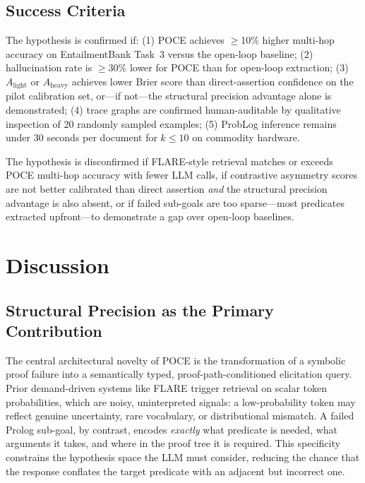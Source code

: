\documentclass[11pt,letterpaper]{article}
\begin{document}
\subsection{Success Criteria}

The hypothesis is confirmed if: (1) POCE achieves $\geq$10\% higher multi-hop accuracy on EntailmentBank Task~3 versus the open-loop baseline; (2) hallucination rate is $\geq$30\% lower for POCE than for open-loop extraction; (3) $A_\text{light}$ or $A_\text{heavy}$ achieves lower Brier score than direct-assertion confidence on the pilot calibration set, or---if not---the structural precision advantage alone is demonstrated; (4) trace graphs are confirmed human-auditable by qualitative inspection of 20 randomly sampled examples; (5) ProbLog inference remains under 30 seconds per document for $k \leq 10$ on commodity hardware.

The hypothesis is disconfirmed if FLARE-style retrieval matches or exceeds POCE multi-hop accuracy with fewer LLM calls, if contrastive asymmetry scores are not better calibrated than direct assertion \emph{and} the structural precision advantage is also absent, or if failed sub-goals are too sparse---most predicates extracted upfront---to demonstrate a gap over open-loop baselines.

\section{Discussion}

\subsection{Structural Precision as the Primary Contribution}

The central architectural novelty of POCE is the transformation of a symbolic proof failure into a semantically typed, proof-path-conditioned elicitation query. Prior demand-driven systems
like FLARE \citep{Jiang2023} trigger retrieval on scalar token probabilities, which are noisy, uninterpreted signals: a low-probability
token may reflect genuine uncertainty, rare vocabulary, or distributional mismatch. A failed Prolog sub-goal, by contrast,
encodes \emph{exactly} what predicate is needed, what arguments it takes, and where in the proof tree it is required. This
specificity constrains the hypothesis space the LLM must consider, reducing the chance that the response conflates the
target predicate with an adjacent but incorrect one.
\end{document}
